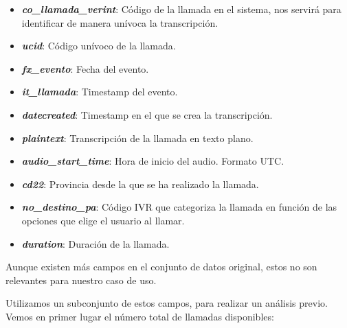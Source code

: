  \begin{itemize}


\item \textbf{\textit{co\_llamada\_verint}}: Código de la llamada en el sistema, nos servirá
para identificar de manera unívoca la transcripción.

 \item \textbf{\textit{ucid}}: Código unívoco de la llamada.

\item \textbf{\textit{fx\_evento}}: Fecha del evento.

\item \textbf{\textit{it\_llamada}}: Timestamp del evento.

\item \textbf{\textit{datecreated}}: Timestamp en el que se crea la transcripción.

\item \textbf{\textit{plaintext}}: Transcripción de la llamada en texto plano.

\item \textbf{\textit{audio\_start\_time}}: Hora de inicio del audio. Formato UTC.

\item \textbf{\textit{cd22}}: Provincia desde la que se ha realizado la llamada. 

\item \textbf{\textit{no\_destino\_pa}}: Código IVR que categoriza la llamada en función de las
opciones que elige el usuario al llamar.

\item \textbf{\textit{duration}}: Duración de la llamada.


 \end{itemize}

Aunque existen más campos en el conjunto de datos original, estos no son relevantes para 
nuestro caso de uso.

    Utilizamos  un subconjunto de estos campos, para realizar un análisis
previo. Vemos en primer lugar el número total de llamadas disponibles:
\vspace{0.5cm}

